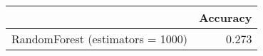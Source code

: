 \begin{tabular}{lr}
\toprule
{} &  Accuracy \\
\midrule
RandomForest (estimators = 1000) &     0.273 \\
\bottomrule
\end{tabular}
